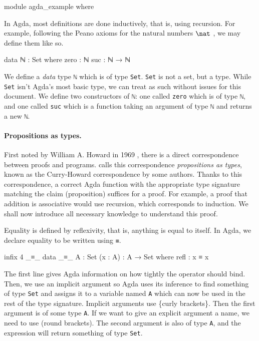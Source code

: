 \begin{code}
module agda_example where
\end{code}

In Agda, most definitions are done inductively, that is, using recursion. For example, following the
Peano axioms for the natural numbers $\nat$ \citep{boolos_freges_1995}, we may define them like so.
\begin{code}
  data ℕ : Set where
    zero : ℕ
    suc  : ℕ → ℕ
\end{code}
We define a \textit{data} type \texttt{ℕ} which is of type \texttt{Set}. \texttt{Set} is not a set,
but a type. While \texttt{Set} isn't Agda's most basic type, we can treat as such without issues for
this document. We define two constructors of \texttt{ℕ}: one called \texttt{zero} which is of type
\texttt{ℕ}, and one called \texttt{suc} which is a function taking an argument of type \texttt{ℕ}
and returns a new \texttt{ℕ}.

\paragraph*{Propositions as types.} First noted by William A. Howard in 1969
\citep{howard_formulae-as-types_1980}, there is a direct correspondence between proofs and programs.
\citet{wadler_propositions_2015} calls this correspondence \textit{propositions as types}, known as
the Curry-Howard correspondence by some authors. Thanks to this correspondence, a correct Agda
function with the appropriate type signature matching the claim (proposition) suffices for a proof.
For example, a proof that addition is associative would use recursion, which corresponds to
induction. We shall now introduce all necessary knowledge to understand this proof.

Equality is defined by reflexivity, that is, anything is equal to itself. In Agda, we declare
equality to be written using \texttt{≡}.
\begin{code}
  infix 4 _≡_
  data _≡_ {A : Set} (x : A) : A → Set where
    refl : x ≡ x
\end{code}
The first line gives Agda information on how tightly the operator should bind. Then, we use an
implicit argument so Agda uses its inference to find something of type \texttt{Set} and assigns it
to a variable named \texttt{A} which can now be used in the rest of the type signature. Implicit
arguments use \{curly brackets\}. Then the first argument is of some type \texttt{A}. If we want to
give an explicit argument a name, we need to use (round brackets). The second argument is also of
type \texttt{A}, and the expression will return something of type \texttt{Set}.

